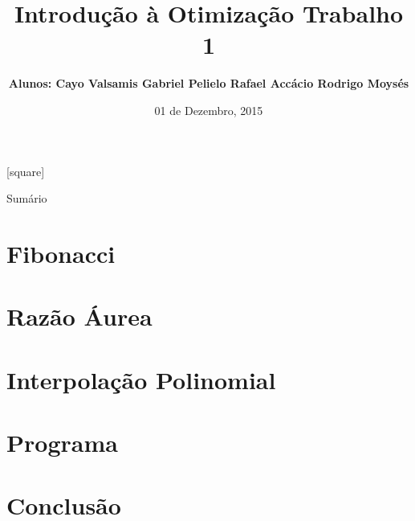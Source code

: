 \documentclass{beamer}
\author{\textbf{Alunos: \newline
		Cayo Valsamis \newline
		Gabriel Pelielo \newline
		Rafael Accácio \newline
		Rodrigo Moysés}}
\title{\textbf{Introdução à Otimização \vspace{0.25cm} \newline 
		       Trabalho 1}}
\institute{Universidade Federal do Rio de Janeiro}
\date{01 de Dezembro, 2015}
\begin{document}
[square]

	
	
\begin{frame}[t,plain]
	\titlepage
\end{frame}
	
\begin{frame}{Sumário}
	\tableofcontents
\end{frame}

%
\section{Fibonacci}



\section{Razão Áurea}


\section{Interpolação Polinomial}


\section{Programa}


\section{Conclusão}

\end{document}
